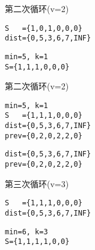 \begin{frame}[fragile]\ft{\subsubsecname}

\tf 第二次循环(v=2) 
\begin{lstlisting}
S   ={1,0,1,0,0,0}
dist={0,5,3,6,7,INF}
\end{lstlisting}



\begin{lstlisting}
min=5, k=1
S={1,1,1,0,0,0}
\end{lstlisting}

\end{frame}


\begin{frame}[fragile]\ft{\subsubsecname}

\tf 第二次循环(v=2)
\begin{lstlisting}
min=5, k=1
S   ={1,1,1,0,0,0}
dist={0,5,3,6,7,INF}
prev={0,2,0,2,2,0}
\end{lstlisting}
 


\begin{lstlisting}
dist={0,5,3,6,7,INF}
prev={0,2,0,2,2,0}
\end{lstlisting}

\end{frame}


\begin{frame}[fragile]\ft{\subsubsecname}

\tf 第三次循环(v=3) 
\begin{lstlisting}
S   ={1,1,1,0,0,0}
dist={0,5,3,6,7,INF}
\end{lstlisting}



\begin{lstlisting}
min=6, k=3
S={1,1,1,1,0,0}
\end{lstlisting}

\end{frame}


